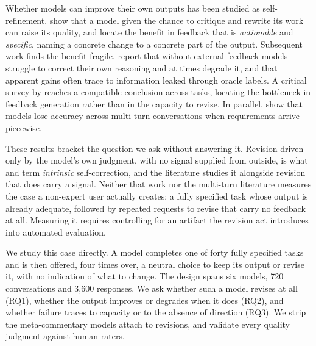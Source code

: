 Whether models can improve their own outputs has been studied as self-refinement.
\citet{madaan2024self} show that a model given the chance to critique and rewrite its work
can raise its quality, and locate the benefit in feedback that is \emph{actionable} and
\emph{specific}, naming a concrete change to a concrete part of the output. Subsequent work
finds the benefit fragile. \citet{huang2024large} report that without external feedback
models struggle to correct their own reasoning and at times degrade it, and that apparent
gains often trace to information leaked through oracle labels. A critical survey by
\citet{kamoi2024selfcorrection} reaches a compatible conclusion across tasks, locating the
bottleneck in feedback generation rather than in the capacity to revise. In parallel,
\citet{laban2025lost} show that models lose accuracy across multi-turn conversations when
requirements arrive piecewise.

These results bracket the question we ask without answering it. Revision driven only by the
model's own judgment, with no signal supplied from outside, is what
\citet{kamoi2024selfcorrection} and \citet{huang2024large} term \emph{intrinsic}
self-correction, and the literature studies it alongside revision that does carry a signal.
Neither that work nor the multi-turn literature measures the case a non-expert user
actually creates: a fully specified task whose output is already adequate, followed by
repeated requests to revise that carry no feedback at all. Measuring it requires
controlling for an artifact the revision act introduces into automated evaluation.

We study this case directly. A model completes one of forty fully specified tasks and is
then offered, four times over, a neutral choice to keep its output or revise it, with no indication of what to change. The design spans six models, 720
conversations and 3,600 responses. We ask whether such a model revises at all (RQ1),
whether the output improves or degrades when it does (RQ2), and whether failure traces to
capacity or to the absence of direction (RQ3).
We strip the meta-commentary models attach to revisions, and validate every quality
judgment against human raters.

